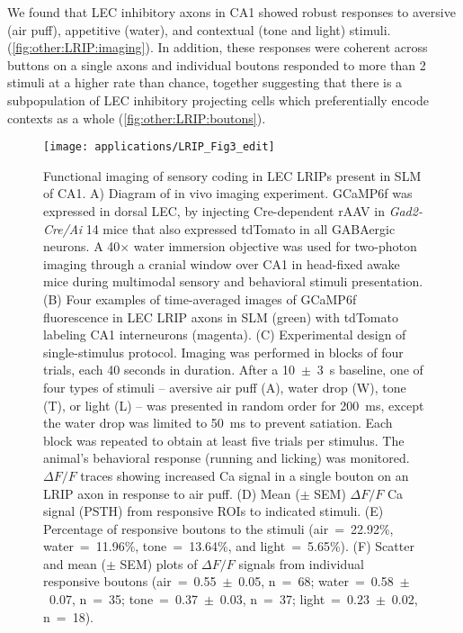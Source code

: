 We found that \ac{LEC} inhibitory axons in CA1 showed robust responses to aversive (air puff), appetitive (water), and contextual (tone and light) stimuli. (\autoref{fig:other:LRIP:imaging}).
In addition, these responses were coherent across buttons on a single axons and individual boutons responded to more than 2 stimuli at a higher rate than chance, together suggesting that there is a subpopulation of LEC inhibitory projecting cells which preferentially encode contexts as a whole (\autoref{fig:other:LRIP:boutons}).

\begin{figure}
	\centering
	\texttt{[image: applications/LRIP\_Fig3\_edit]}
	\caption[Functional imaging of sensory coding in LEC LRIPs present in SLM of CA1]{Functional imaging of sensory coding in LEC LRIPs present in SLM of CA1.
	A) Diagram of in vivo imaging experiment. GCaMP6f was expressed in dorsal LEC, by injecting Cre-dependent rAAV in \emph{Gad2-Cre/Ai} 14 mice that also expressed tdTomato in all GABAergic neurons. A 40$\times$ water immersion objective was used for two-photon imaging through a cranial window over CA1 in head-fixed awake mice during multimodal sensory and behavioral stimuli presentation.
	(B) Four examples of time-averaged images of GCaMP6f fluorescence in LEC LRIP axons in SLM (green) with tdTomato labeling CA1 interneurons (magenta).
	(C) Experimental design of single-stimulus protocol. Imaging was performed in blocks of four trials, each 40 seconds in duration. After a 10~$\pm$~3~s baseline, one of four types of stimuli -- aversive air puff (A), water drop (W), tone (T), or light (L) -- was presented in random order for 200~ms, except the water drop was limited to 50~ms to prevent satiation. Each block was repeated to obtain at least five trials per stimulus. The animal's behavioral response (running and licking) was monitored. $\Delta F/F$ traces showing increased Ca signal in a single bouton on an LRIP axon in response to air puff.
	(D) Mean ($\pm$ SEM) $\Delta F/F$ Ca signal (PSTH) from responsive ROIs to indicated stimuli.
	(E) Percentage of responsive boutons to the stimuli (air~=~22.92\%, water~=~11.96\%, tone~=~13.64\%, and light~=~5.65\%).
	(F) Scatter and mean ($\pm$ SEM) plots of $\Delta F/F$ signals from individual responsive boutons (air~=~0.55~$\pm$~0.05, n~=~68; water~=~0.58~$\pm$~0.07, n~=~35; tone~=~0.37~$\pm$~0.03, n~=~37; light~=~0.23~$\pm$~0.02, n~=~18).
}
\end{figure}

